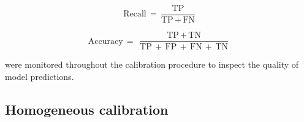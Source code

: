 \begin{equation}
    \text{Recall}\,=\,\frac{\text{TP}}{\text{TP}\,+\,\text{FN}}
    \label{eq:recall}
\end{equation}

\begin{equation}
    \text{Accuracy}\,=\,\frac{\text{TP}\,+\,\text{TN}}{\text{TP}\,+\,\text{FP}\,+\,\text{FN}\,+\,\text{TN}}
    \label{eq:accuracy}
\end{equation}

\noindent were monitored throughout the calibration procedure to inspect the quality of model predictions.





\subsection{Homogeneous calibration}

